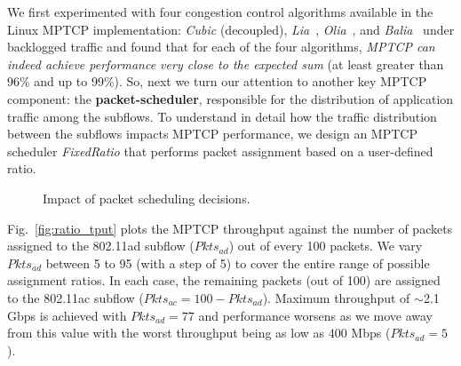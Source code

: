 We first experimented with four congestion control algorithms available in the
Linux MPTCP implementation: \emph{Cubic} (decoupled), \emph{Lia}~\cite{raiciu:rfc6356}, 
\emph{Olia}~\cite{khalili:ton2013}, and \emph{Balia}~\cite{peng:ton2016} under backlogged
traffic and found that for each of the four algorithms, \textit{MPTCP can indeed achieve 
performance very close to the expected sum} (at least greater than 96\% and up to 99\%). So,
 next we turn our attention to another key MPTCP component: the \textbf{packet-scheduler},
responsible for the distribution of application traffic among the subflows. To understand in 
detail how the traffic distribution between the subflows impacts MPTCP performance, we 
design an MPTCP scheduler \emph{FixedRatio} that performs packet assignment based on
a user-defined ratio.

\begin{figure}[h]
    \centering
    \hfill
    \caption{Impact of packet scheduling decisions.}
\end{figure}

Fig.~\ref{fig:ratio_tput} plots the MPTCP throughput against the
number of packets assigned to the 802.11ad subflow ($Pkts_{ad}$) out
of every 100 packets. We vary $Pkts_{ad}$ between 5 to 95 (with a step
of 5) to cover the entire range of possible assignment ratios. In each
case, the remaining packets (out of 100) are assigned to the 802.11ac
subflow ($Pkts_{ac}=100-Pkts_{ad}$). Maximum throughput of $\sim$2.1
Gbps is achieved with $Pkts_{ad}=77$ and performance worsens as we
move away from this value with the worst throughput being as low as
400 Mbps ($Pkts_{ad}=5$).

